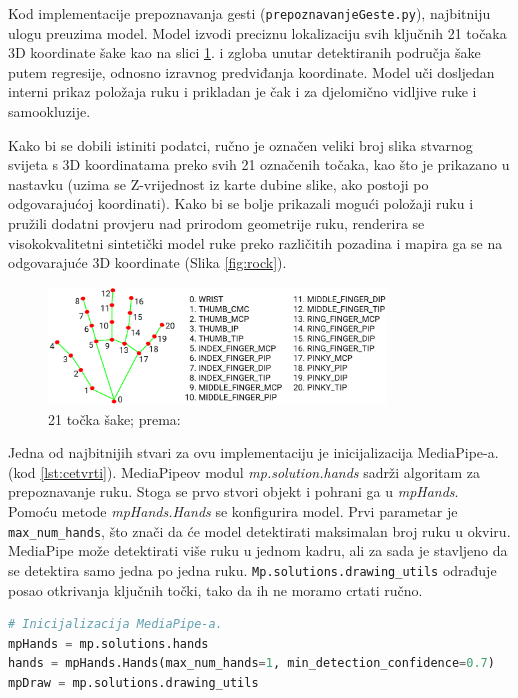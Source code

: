 \documentclass[]{foi} %
\begin{document}
Kod implementacije prepoznavanja gesti (\texttt{prepoznavanjeGeste.py}), najbitniju ulogu preuzima model. Model izvodi preciznu lokalizaciju svih ključnih 21 točaka 3D koordinate šake kao na slici \ref{fig:prsti}. i zgloba unutar detektiranih područja šake putem regresije, odnosno izravnog predviđanja koordinate. Model uči dosljedan interni prikaz položaja ruku i prikladan je čak i za djelomično vidljive ruke i samookluzije.

Kako bi se dobili istiniti podatci, ručno je označen veliki broj slika stvarnog svijeta s 3D koordinatama preko svih 21 označenih točaka, kao što je prikazano u nastavku (uzima se Z-vrijednost iz karte dubine slike, ako postoji po odgovarajućoj koordinati). Kako bi se bolje prikazali mogući položaji ruku i pružili dodatni provjeru nad prirodom geometrije ruku, renderira se visokokvalitetni sintetički model ruke preko različitih pozadina i mapira ga se na odgovarajuće 3D koordinate (Slika \ref{fig:rock}).

\begin{figure}[!ht]
    \centering
    \includegraphics[width=0.8\textwidth]{slike/prsti.png}
    \caption{21 točka šake; prema: \cite{opencv}}
    \label{fig:prsti}
\end{figure}

Jedna od najbitnijih stvari za ovu implementaciju je inicijalizacija MediaPipe-a. (kod \ref{lst:cetvrti}). MediaPipeov modul \textit{mp.solution.hands} sadrži algoritam za prepoznavanje ruku. Stoga se prvo stvori objekt i pohrani ga u \textit{mpHands}.
Pomoću metode \textit{mpHands.Hands} se konfigurira model. Prvi parametar je \texttt{max\_num\_hands}, što znači da će model detektirati maksimalan broj ruku u okviru. MediaPipe može detektirati više ruku u jednom kadru, ali za sada je stavljeno da se detektira samo jedna po jedna ruku.
\texttt{Mp.solutions.drawing\_utils} odrađuje posao otkrivanja ključnih točki, tako da ih ne moramo crtati ručno.

\begin{lstlisting}[language=Python, caption={[Inicijalizacija MediaPipea] Inicijalizacija MediaPipea}, label=lst:cetvrti]
# Inicijalizacija MediaPipe-a.
mpHands = mp.solutions.hands
hands = mpHands.Hands(max_num_hands=1, min_detection_confidence=0.7)
mpDraw = mp.solutions.drawing_utils
\end{lstlisting}
\end{document}
